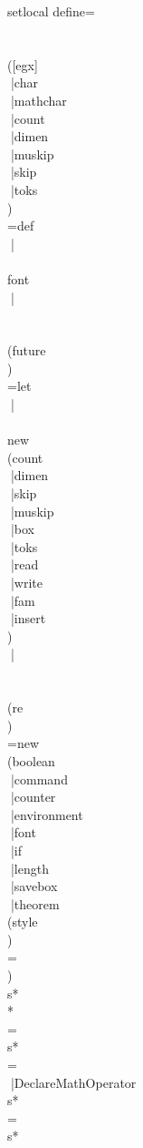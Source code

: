 setlocal define=\\\\\\([egx]\\|char\\|mathchar\\|count\\|dimen\\|muskip\\|skip\\|toks\\)\\=def\\|\\\\font\\|\\\\\\(future\\)\\=let\\|\\\\new\\(count\\|dimen\\|skip\\|muskip\\|box\\|toks\\|read\\|write\\|fam\\|insert\\)\\|\\\\\\(re\\)\\=new\\(boolean\\|command\\|counter\\|environment\\|font\\|if\\|length\\|savebox\\|theorem\\(style\\)\\=\\)\\s*\\*\\=\\s*{\\=\\|DeclareMathOperator\\s*{\\=\\s*
}}
